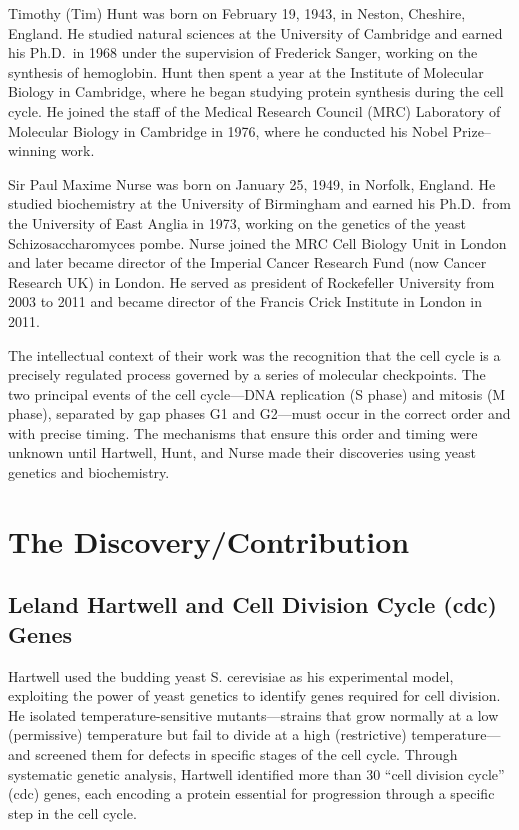 Timothy (Tim) Hunt was born on February 19, 1943, in Neston, Cheshire, England. He studied natural sciences at the University of Cambridge and earned his Ph.D.\ in 1968 under the supervision of Frederick Sanger, working on the synthesis of hemoglobin. Hunt then spent a year at the Institute of Molecular Biology in Cambridge, where he began studying protein synthesis during the cell cycle. He joined the staff of the Medical Research Council (MRC) Laboratory of Molecular Biology in Cambridge in 1976, where he conducted his Nobel Prize--winning work.

Sir Paul Maxime Nurse was born on January 25, 1949, in Norfolk, England. He studied biochemistry at the University of Birmingham and earned his Ph.D.\ from the University of East Anglia in 1973, working on the genetics of the yeast Schizosaccharomyces pombe. Nurse joined the MRC Cell Biology Unit in London and later became director of the Imperial Cancer Research Fund (now Cancer Research UK) in London. He served as president of Rockefeller University from 2003 to 2011 and became director of the Francis Crick Institute in London in 2011.

The intellectual context of their work was the recognition that the cell cycle is a precisely regulated process governed by a series of molecular checkpoints. The two principal events of the cell cycle---DNA replication (S phase) and mitosis (M phase), separated by gap phases G1 and G2---must occur in the correct order and with precise timing. The mechanisms that ensure this order and timing were unknown until Hartwell, Hunt, and Nurse made their discoveries using yeast genetics and biochemistry.

\section{The Discovery/Contribution}

\subsection{Leland Hartwell and Cell Division Cycle (cdc) Genes}

Hartwell used the budding yeast S. cerevisiae as his experimental model, exploiting the power of yeast genetics to identify genes required for cell division. He isolated temperature-sensitive mutants---strains that grow normally at a low (permissive) temperature but fail to divide at a high (restrictive) temperature---and screened them for defects in specific stages of the cell cycle. Through systematic genetic analysis, Hartwell identified more than 30 ``cell division cycle'' (cdc) genes, each encoding a protein essential for progression through a specific step in the cell cycle.

